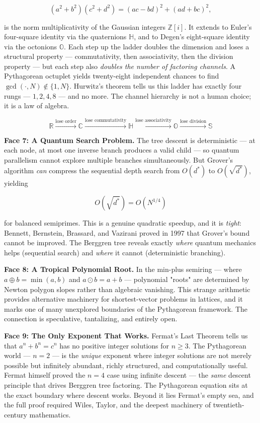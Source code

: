 \[
(a^2 + b^2)(c^2 + d^2) = (ac - bd)^2 + (ad + bc)^2,\]

is the norm multiplicativity of the Gaussian integers $\mathbb{Z}[i]$. It extends to Euler's four-square identity via the quaternions $\mathbb{H}$, and to Degen's eight-square identity via the octonions $\mathbb{O}$. Each step up the ladder doubles the dimension and loses a structural property --- commutativity, then associativity, then the division property --- but each step also \textit{doubles the number of factoring channels}. A Pythagorean octuplet yields twenty-eight independent chances to find $\gcd(\cdot, N) \notin \{1, N\}$. Hurwitz's theorem tells us this ladder has exactly four rungs --- $1, 2, 4, 8$ --- and no more. The channel hierarchy is not a human choice; it is a law of algebra.

\[
\mathbb{R} \xrightarrow{\text{lose order}} \mathbb{C} \xrightarrow{\text{lose commutativity}} \mathbb{H} \xrightarrow{\text{lose associativity}} \mathbb{O} \xrightarrow{\text{lose division}} \mathbb{S}\]

\textbf{Face 7: A Quantum Search Problem.} The tree descent is deterministic --- at each node, at most one inverse branch produces a valid child --- so quantum parallelism cannot explore multiple branches simultaneously. But Grover's algorithm \textit{can} compress the sequential depth search from $O(d^*)$ to $O(\sqrt{d^*})$, yielding

\[
O(\sqrt{d^*}) = O(N^{1/4})\]

for balanced semiprimes. This is a genuine quadratic speedup, and it is \textit{tight}: Bennett, Bernstein, Brassard, and Vazirani proved in 1997 that Grover's bound cannot be improved. The Berggren tree reveals exactly \textit{where} quantum mechanics helps (sequential search) and \textit{where} it cannot (deterministic branching).

\textbf{Face 8: A Tropical Polynomial Root.} In the min-plus semiring --- where $a \oplus b = \min(a,b)$ and $a \odot b = a + b$ --- polynomial "roots" are determined by Newton polygon slopes rather than algebraic vanishing. This strange arithmetic provides alternative machinery for shortest-vector problems in lattices, and it marks one of many unexplored boundaries of the Pythagorean framework. The connection is speculative, tantalizing, and entirely open.

\textbf{Face 9: The Only Exponent That Works.} Fermat's Last Theorem tells us that $a^n + b^n = c^n$ has no positive integer solutions for $n \geq 3$. The Pythagorean world --- $n = 2$ --- is the \textit{unique} exponent where integer solutions are not merely possible but infinitely abundant, richly structured, and computationally useful. Fermat himself proved the $n = 4$ case using infinite descent --- the \textit{same} descent principle that drives Berggren tree factoring. The Pythagorean equation sits at the exact boundary where descent works. Beyond it lies Fermat's empty sea, and the full proof required Wiles, Taylor, and the deepest machinery of twentieth-century mathematics.



